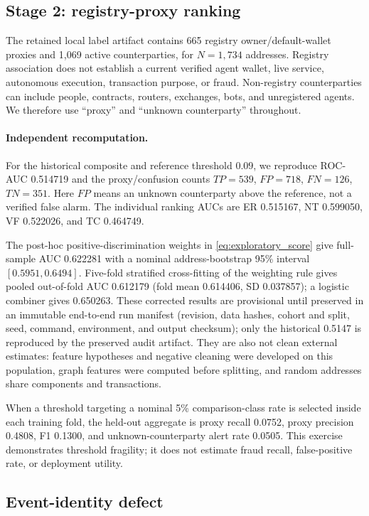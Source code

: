 \subsection{Stage 2: registry-proxy ranking}

The retained local label artifact contains 665 registry owner/default-wallet
proxies and 1,069 active counterparties, for $N=1{,}734$ addresses.  Registry
association does not establish a current verified agent wallet, live service,
autonomous execution, transaction purpose, or fraud.  Non-registry
counterparties can include people, contracts, routers, exchanges, bots, and
unregistered agents.  We therefore use ``proxy'' and ``unknown counterparty''
throughout.

\paragraph{Independent recomputation.}
For the historical composite and reference threshold $0.09$, we reproduce
ROC-AUC 0.514719 and the proxy/confusion counts $TP=539$, $FP=718$, $FN=126$,
$TN=351$.  Here $FP$ means an unknown counterparty above the reference, not a
verified false alarm.  The individual ranking AUCs are ER 0.515167, NT
0.599050, VF 0.522026, and TC 0.464749.

The post-hoc positive-discrimination weights in
\cref{eq:exploratory_score} give full-sample AUC 0.622281 with a nominal
address-bootstrap 95\% interval $[0.5951,0.6494]$.  Five-fold stratified
cross-fitting of the weighting rule gives pooled out-of-fold AUC 0.612179
(fold mean 0.614406, SD 0.037857); a logistic combiner gives 0.650263.  These
corrected results are provisional until preserved in an immutable end-to-end
run manifest (revision, data hashes, cohort and split, seed, command,
environment, and output checksum); only the historical 0.5147 is reproduced by
the preserved audit artifact.  They are also not clean external estimates: feature hypotheses and negative cleaning
were developed on this population, graph features were computed before
splitting, and random addresses share components and transactions.

When a threshold targeting a nominal 5\% comparison-class rate is selected
inside each training fold, the held-out aggregate is proxy recall 0.0752,
proxy precision 0.4808, F1 0.1300, and unknown-counterparty alert rate 0.0505.
This exercise demonstrates threshold fragility; it does not estimate fraud
recall, false-positive rate, or deployment utility.

\subsection{Event-identity defect}

